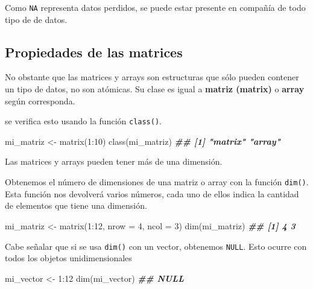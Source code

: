 \documentclass[
]{book}
\newenvironment{Shaded}{\begin{snugshade}}{\end{snugshade}}
\newcommand{\AttributeTok}[1]{\textcolor[rgb]{0.77,0.63,0.00}{#1}}
\newcommand{\DecValTok}[1]{\textcolor[rgb]{0.00,0.00,0.81}{#1}}
\newcommand{\DocumentationTok}[1]{\textcolor[rgb]{0.56,0.35,0.01}{\textbf{\textit{#1}}}}
\newcommand{\FunctionTok}[1]{\textcolor[rgb]{0.00,0.00,0.00}{#1}}
\newcommand{\NormalTok}[1]{#1}
\newcommand{\OtherTok}[1]{\textcolor[rgb]{0.56,0.35,0.01}{#1}}
\newcommand{\SpecialCharTok}[1]{\textcolor[rgb]{0.00,0.00,0.00}{#1}}
\begin{document}
Como \texttt{NA} representa datos perdidos, se puede estar presente en compañía de todo tipo de de datos.

\hypertarget{propiedades-de-las-matrices}{%
\subsection{Propiedades de las matrices}\label{propiedades-de-las-matrices}}

No obstante que las matrices y arrays son estructuras que sólo pueden contener un tipo de datos, no son atómicas. Su clase es igual a \textbf{matriz (matrix)} o \textbf{array} según corresponda.

se verifica esto usando la función \texttt{class()}.

\begin{Shaded}
\begin{Highlighting}[]
\NormalTok{mi\_matriz }\OtherTok{\textless{}{-}} \FunctionTok{matrix}\NormalTok{(}\DecValTok{1}\SpecialCharTok{:}\DecValTok{10}\NormalTok{)}
\FunctionTok{class}\NormalTok{(mi\_matriz)}
\DocumentationTok{\#\# [1] "matrix" "array"}
\end{Highlighting}
\end{Shaded}

Las matrices y arrays pueden tener más de una dimensión.

Obtenemos el número de dimensiones de una matriz o array con la función \texttt{dim()}. Esta función nos devolverá varios números, cada uno de ellos indica la cantidad de elementos que tiene una dimensión.

\begin{Shaded}
\begin{Highlighting}[]
\NormalTok{mi\_matriz }\OtherTok{\textless{}{-}} \FunctionTok{matrix}\NormalTok{(}\DecValTok{1}\SpecialCharTok{:}\DecValTok{12}\NormalTok{, }\AttributeTok{nrow =} \DecValTok{4}\NormalTok{, }\AttributeTok{ncol =} \DecValTok{3}\NormalTok{)}
\FunctionTok{dim}\NormalTok{(mi\_matriz)}
\DocumentationTok{\#\# [1] 4 3}
\end{Highlighting}
\end{Shaded}

Cabe señalar que si se usa \texttt{dim()} con un vector, obtenemos \texttt{NULL}. Esto ocurre con todos los objetos unidimensionales

\begin{Shaded}
\begin{Highlighting}[]
\NormalTok{mi\_vector }\OtherTok{\textless{}{-}} \DecValTok{1}\SpecialCharTok{:}\DecValTok{12}
\FunctionTok{dim}\NormalTok{(mi\_vector)}
\DocumentationTok{\#\# NULL}
\end{Highlighting}
\end{Shaded}
\end{document}
